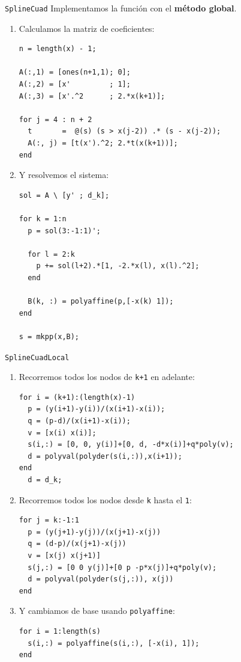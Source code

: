 \documentclass[compress]{beamer}
\theoremstyle{definition}
\theoremstyle{remark}
\begin{document}
\begin{frame}[fragile]{\texttt{SplineCuad}}
Implementamos la función con el \textbf{método global}.
\begin{enumerate}[<only@+>]
\item Calculamos la matriz de coeficientes:
\begin{lstlisting}
n = length(x) - 1;

A(:,1) = [ones(n+1,1); 0];
A(:,2) = [x'         ; 1];
A(:,3) = [x'.^2      ; 2.*x(k+1)];

for j = 4 : n + 2
  t       =  @(s) (s > x(j-2)) .* (s - x(j-2));
  A(:, j) = [t(x').^2; 2.*t(x(k+1))];
end
\end{lstlisting}

\item Y resolvemos el sistema:
\begin{lstlisting}
sol = A \ [y' ; d_k];

for k = 1:n
  p = sol(3:-1:1)';

  for l = 2:k
    p += sol(l+2).*[1, -2.*x(l), x(l).^2];
  end

  B(k, :) = polyaffine(p,[-x(k) 1]);
end

s = mkpp(x,B);
\end{lstlisting}
\end{enumerate}
\end{frame}

\begin{frame}[fragile]{\texttt{SplineCuadLocal}}
\begin{enumerate}[<only@+>]

\item Recorremos todos los nodos de \texttt{k+1} en adelante:
\begin{lstlisting}
for i = (k+1):(length(x)-1)
  p = (y(i+1)-y(i))/(x(i+1)-x(i));
  q = (p-d)/(x(i+1)-x(i));
  v = [x(i) x(i)];
  s(i,:) = [0, 0, y(i)]+[0, d, -d*x(i)]+q*poly(v);
  d = polyval(polyder(s(i,:)),x(i+1));
end
  d = d_k;
\end{lstlisting}

\item Recorremos todos los nodos desde \texttt{k} hasta el \texttt{1}:
\begin{lstlisting}
for j = k:-1:1
  p = (y(j+1)-y(j))/(x(j+1)-x(j))
  q = (d-p)/(x(j+1)-x(j))
  v = [x(j) x(j+1)]
  s(j,:) = [0 0 y(j)]+[0 p -p*x(j)]+q*poly(v);
  d = polyval(polyder(s(j,:)), x(j))
end
\end{lstlisting}

\item Y cambiamos de base usando \texttt{polyaffine}:
\begin{lstlisting}
for i = 1:length(s)
  s(i,:) = polyaffine(s(i,:), [-x(i), 1]);
end
\end{lstlisting}
\end{enumerate}
\end{frame}
\end{document}
